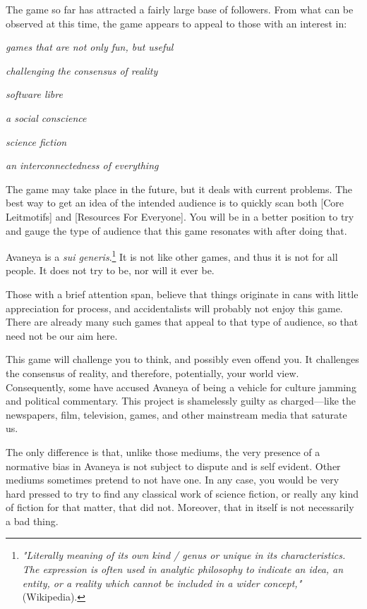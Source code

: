 The game so far has attracted a fairly large base of followers. From what can be observed at this time, the game appears to appeal to those with an interest in:

\startitemize[3]
\item
{\it games that are not only fun, but useful}
\item
{\it challenging the consensus of reality}
\item
{\it software libre}
\item
{\it a social conscience}
\item
{\it science fiction}
\item
{\it an interconnectedness of everything}
\stopitemize

The game may take place in the future, but it deals with current problems. The best way to get an idea of the intended audience is to quickly scan both [Core Leitmotifs] and [Resources For Everyone]. You will be in a better position to try and gauge the type of audience that this game resonates with after doing that. 

Avaneya is a {\it sui generis}.\footnote{{\it "Literally meaning of its own kind / genus or unique in its characteristics. The expression is often used in analytic philosophy to indicate an idea, an entity, or a reality which cannot be included in a wider concept,"} (Wikipedia).} It is not like other games, and thus it is not for all people. It does not try to be, nor will it ever be.

Those with a brief attention span, believe that things originate in cans with little appreciation for process, and accidentalists will probably not enjoy this game. There are already many such games that appeal to that type of audience, so that need not be our aim here.

This game will challenge you to think, and possibly even offend you. It challenges the consensus of reality, and therefore, potentially, your world view. Consequently, some have accused Avaneya of being a vehicle for culture jamming and political commentary. This project is shamelessly guilty as charged---like the newspapers, film, television, games, and other mainstream media that saturate us. 

The only difference is that, unlike those mediums, the very presence of a normative bias in Avaneya is not subject to dispute and is self evident. Other mediums sometimes pretend to not have one. In any case, you would be very hard pressed to try to find any classical work of science fiction, or really any kind of fiction for that matter, that did not. Moreover, that in itself is not necessarily a bad thing.

